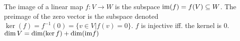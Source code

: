  The image of a linear map $f : V \to W$ is the subspace $\text{im}(f) = f(V) \subseteq W$. The preimage of the zero vector is the subspace denoted $\ker(f) = f^{-1}(0) = \{v \in V | f(v)=0\}$.
 $f$ is injective iff. the kernel is 0.
 $\dim V = \dim(\ker f) + \dim(\text{im} f)$
